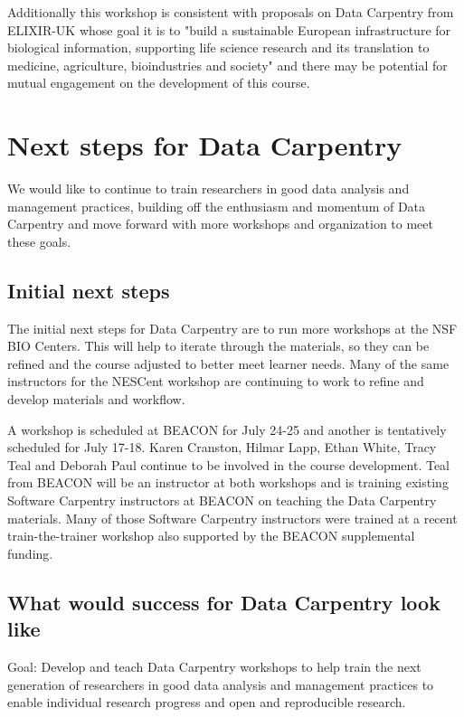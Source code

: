\documentclass[11pt]{article}
\begin{document}
Additionally this workshop is consistent with proposals on Data Carpentry from ELIXIR-UK whose goal it is to "build a sustainable European infrastructure for biological information, supporting life science research and its translation to medicine, agriculture, bioindustries and society" and there may be potential for mutual engagement on the development of this course. 

\section{Next steps for Data Carpentry}

We would like to continue to train researchers in good data analysis and management practices, building off the enthusiasm and momentum of Data Carpentry and move forward with more workshops and organization to meet 
these goals.

\subsection{Initial next steps}

The initial next steps for Data Carpentry are to run more workshops at the NSF BIO Centers. This will help to 
iterate through the materials, so they can be refined and the course adjusted to better meet learner needs. Many of the same instructors for the NESCent workshop are continuing to work to refine and develop materials and workflow.

A workshop is scheduled at BEACON for July 24-25 and another is tentatively scheduled for July 17-18. Karen Cranston, Hilmar Lapp, Ethan White, Tracy Teal and Deborah Paul continue to be involved in the course development. Teal from BEACON will be an instructor at both workshops and is training existing Software Carpentry instructors at BEACON on teaching the Data Carpentry materials. Many of those Software Carpentry instructors were trained at a recent train-the-trainer workshop also supported by the BEACON supplemental funding. 

\subsection{What would success for Data Carpentry look like}

\hangindent=0.7cm Goal: Develop and teach Data Carpentry workshops to help train the next generation of researchers in good data analysis and management practices to enable individual research progress and open and reproducible research. 
\end{document}
